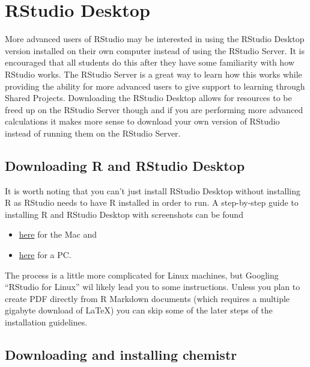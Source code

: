 \documentclass[]{tufte-book}
\providecommand{\tightlist}{%
  \setlength{\itemsep}{0pt}\setlength{\parskip}{0pt}}
\begin{document}
\appendix


\chapter{RStudio Desktop}\label{rstudio-desktop}

More advanced users of RStudio may be interested in using the RStudio
Desktop version installed on their own computer instead of using the
RStudio Server. It is encouraged that all students do this after they
have some familiarity with how RStudio works. The RStudio Server is a
great way to learn how this works while providing the ability for more
advanced users to give support to learning through Shared Projects.
Downloading the RStudio Desktop allows for resources to be freed up on
the RStudio Server though and if you are performing more advanced
calculations it makes more sense to download your own version of RStudio
instead of running them on the RStudio Server.

\section{Downloading R and RStudio
Desktop}\label{downloading-r-and-rstudio-desktop}

It is worth noting that you can't just install RStudio Desktop without
installing R as RStudio needs to have R installed in order to run. A
step-by-step guide to installing R and RStudio Desktop with screenshots
can be found

\begin{itemize}
\tightlist
\item
  \href{http://www.reed.edu/data-at-reed/software/R/r_studio.html}{here}
  for the Mac and
\item
  \href{http://www.reed.edu/data-at-reed/software/R/r_studio_pc.html}{here}
  for a PC.
\end{itemize}

The process is a little more complicated for Linux machines, but
Googling ``RStudio for Linux'' wil likely lead you to some instructions.
Unless you plan to create PDF directly from R Markdown documents (which
requires a multiple gigabyte download of LaTeX) you can skip some of the
later steps of the installation guidelines.

\section{Downloading and installing
chemistr}\label{downloading-and-installing-chemistr}
\end{document}
